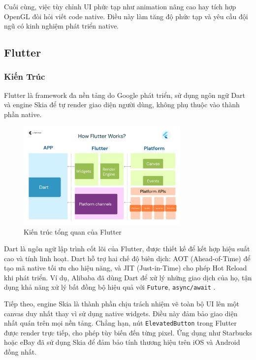 \vspace{0.5em}

Cuối cùng, việc tùy chỉnh UI phức tạp như animation nâng cao hay tích hợp OpenGL đòi hỏi viết code native.  
Điều này làm tăng độ phức tạp và yêu cầu đội ngũ có kinh nghiệm phát triển native.

\subsection{Flutter}
\renewcommand{\labelitemi}{--}    
\subsubsection{Kiến Trúc}

Flutter là framework đa nền tảng do Google phát triển, sử dụng ngôn ngữ Dart và engine Skia để tự render giao diện người dùng, không phụ thuộc vào thành phần native.

\begin{figure}[H]
    \centering
    \includegraphics[width=0.75\textwidth]{images/flutter.png}
    \caption{Kiến trúc tổng quan của Flutter~\cite{antino2022}}
\end{figure}

Dart là ngôn ngữ lập trình cốt lõi của Flutter, được thiết kế để kết hợp hiệu suất cao và tính linh hoạt. Dart hỗ trợ hai chế độ biên dịch: AOT (Ahead-of-Time) để tạo mã native tối ưu cho hiệu năng, và JIT (Just-in-Time) cho phép Hot Reload khi phát triển. Ví dụ, Alibaba đã dùng Dart để xử lý những giao dịch của họ, tận dụng khả năng xử lý bất đồng bộ hiệu quả với \texttt{Future}, \texttt{async/await} \cite{dartusers}.

\vspace{0.5em}

Tiếp theo, engine Skia là thành phần chịu trách nhiệm vẽ toàn bộ UI lên một canvas duy nhất thay vì sử dụng native widgets. Điều này đảm bảo giao diện nhất quán trên mọi nền tảng. Chẳng hạn, nút \texttt{ElevatedButton} trong Flutter được render trực tiếp, cho phép tùy biến đến từng pixel. Ứng dụng như Starbucks hoặc eBay đã sử dụng Skia để đảm bảo tính thương hiệu trên iOS và Android đồng nhất.

